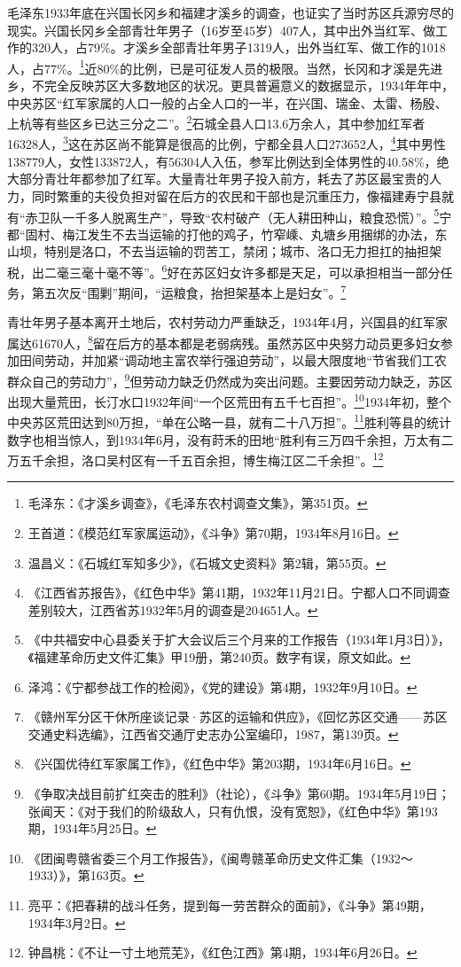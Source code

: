 毛泽东1933年底在兴国长冈乡和福建才溪乡的调查，也证实了当时苏区兵源穷尽的现实。兴国长冈乡全部青壮年男子（16岁至45岁）407人，其中出外当红军、做工作的320人，占79\%。才溪乡全部青壮年男子1319人，出外当红军、做工作的1018人，占77\%。\footnote{毛泽东：《才溪乡调查》，《毛泽东农村调查文集》，第351页。}近80\%的比例，已是可征发人员的极限。当然，长冈和才溪是先进乡，不完全反映苏区大多数地区的状况。更具普遍意义的数据显示，1934年年中，中央苏区“红军家属的人口一般的占全人口的一半，在兴国、瑞金、太雷、杨殷、上杭等有些区乡已达三分之二”。\footnote{王首道：《模范红军家属运动》，《斗争》第70期，1934年8月16日。}石城全县人口13.6万余人，其中参加红军者16328人，\footnote{温昌义：《石城红军知多少》，《石城文史资料》第2辑，第55页。}这在苏区尚不能算是很高的比例，宁都全县人口273652人，\footnote{《江西省苏报告》，《红色中华》第41期，1932年11月21日。宁都人口不同调查差别较大，江西省苏1932年5月的调查是204651人。}其中男性138779人，女性133872人，有56304人入伍，参军比例达到全体男性的40.58\%，绝大部分青壮年都参加了红军。大量青壮年男子投入前方，耗去了苏区最宝贵的人力，同时繁重的夫役负担对留在后方的农民和干部也是沉重压力，像福建寿宁县就有“赤卫队一千多人脱离生产”，导致“农村破产（无人耕田种山，粮食恐慌）”。\footnote{《中共福安中心县委关于扩大会议后三个月来的工作报告（1934年1月3日）》，《福建革命历史文件汇集》甲19册，第240页。数字有误，原文如此。}宁都“固村、梅江发生不去当运输的打他的鸡子，竹窄嵊、丸塘乡用捆绑的办法，东山坝，特别是洛口，不去当运输的罚苦工，禁闭；城市、洛口无力担扛的抽担架税，出二毫三毫十毫不等”。\footnote{泽鸿：《宁都参战工作的检阅》，《党的建设》第4期，1932年9月10日。}好在苏区妇女许多都是天足，可以承担相当一部分任务，第五次反“围剿”期间，“运粮食，抬担架基本上是妇女”。\footnote{《赣州军分区干休所座谈记录·苏区的运输和供应》，《回忆苏区交通——苏区交通史料选编》，江西省交通厅史志办公室编印，1987，第139页。}


青壮年男子基本离开土地后，农村劳动力严重缺乏，1934年4月，兴国县的红军家属达61670人，\footnote{《兴国优待红军家属工作》，《红色中华》第203期，1934年6月16日。}留在后方的基本都是老弱病残。虽然苏区中央努力动员更多妇女参加田间劳动，并加紧“调动地主富农举行强迫劳动”，以最大限度地“节省我们工农群众自己的劳动力”，\footnote{《争取决战目前扩红突击的胜利》（社论），《斗争》第60期。1934年5月19日；张闻天：《对于我们的阶级敌人，只有仇恨，没有宽恕》，《红色中华》第193期，1934年5月25日。}但劳动力缺乏仍然成为突出问题。主要因劳动力缺乏，苏区出现大量荒田，长汀水口1932年间“一个区荒田有五千七百担”。\footnote{《团闽粤赣省委三个月工作报告》，《闽粤赣革命历史文件汇集（1932～1933）》，第163页。}1934年初，整个中央苏区荒田达到80万担，“单在公略一县，就有二十八万担”。\footnote{亮平：《把春耕的战斗任务，提到每一劳苦群众的面前》，《斗争》第49期，1934年3月2日。}胜利等县的统计数字也相当惊人，到1934年6月，没有莳禾的田地“胜利有三万四千余担，万太有二万五千余担，洛口吴村区有一千五百余担，博生梅江区二千余担”。\footnote{钟昌桃：《不让一寸土地荒芜》，《红色江西》第4期，1934年6月26日。}


